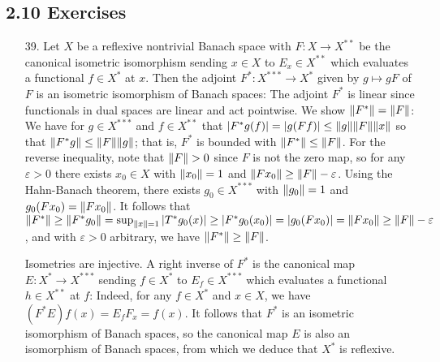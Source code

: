 \documentclass[11pt,leqno]{article}
\theoremstyle{plain}
\theoremstyle{definition}
\numberwithin{equation}{section}
\numberwithin{lem}{section}
\begin{document}
\subsection*{2.10 Exercises}
\begin{enumerate}
  \item[39.] Let $X$ be a reflexive nontrivial Banach space with $F\colon X\to X^{\ast\ast}$ be the canonical isometric isomorphism sending $x\in X$ to $E_x\in X^{\ast\ast}$ which evaluates a functional $f\in X^\ast$ at $x$. Then the adjoint $F^\ast\colon X^{\ast\ast\ast}\to X^\ast$ given by $g\mapsto gF$ of $F$ is an isometric isomorphism of Banach spaces: The adjoint $F^\ast$ is linear since functionals in dual spaces are linear and act pointwise. We show $\norm{F^\ast} = \norm{F}$: We have for $g\in X^{\ast\ast\ast}$ and $f\in X^{\ast\ast}$ that $\abs{F^\ast g(f)} = \abs{g(Ff)} \leq \norm{g}\norm{F}\norm{x}$ so that $\norm{F^\ast g}\leq \norm{F}\norm{g}$; that is, $F^\ast$ is bounded with $\norm{F^\ast}\leq \norm{F}$. For the reverse inequality, note that $\norm{F}>0$ since $F$ is not the zero map, so for any $\varepsilon>0$ there exists $x_0\in X$ with $\norm{x_0} = 1$ and $\norm{Fx_0}\geq \norm{F} - \varepsilon$. Using the Hahn-Banach theorem, there exists $g_0\in X^{\ast\ast\ast}$ with $\norm{g_0} = 1$ and $g_0(Fx_0) = \norm{Fx_0}$. It follows that $\norm{F^\ast}\geq \norm{F^\ast g_0} = \sup_{\norm{x} =1}\abs{T^\ast g_0(x)}\geq \abs{F^\ast g_0(x_0)} = \abs{g_0(Fx_0)} = \norm{Fx_0}\geq \norm{F} - \varepsilon$, and with $\varepsilon>0$ arbitrary, we have $\norm{F^\ast}\geq \norm{F}$.
  
  Isometries are injective. A right inverse of $F^\ast$ is the canonical map $E\colon X^\ast\to X^{\ast\ast\ast}$ sending $f\in X^\ast$ to $E_f\in X^{\ast\ast\ast}$ which evaluates a functional $h\in X^{\ast\ast}$ at $f$: Indeed, for any $f\in X^\ast$ and $x\in X$, we have $(F^\ast E)f(x) = E_fF_x = f(x)$. It follows that $F^\ast$ is an isometric isomorphism of Banach spaces, so the canonical map $E$ is also an isomorphism of Banach spaces, from which we deduce that $X^\ast$ is reflexive.


\end{enumerate}
\end{document}
